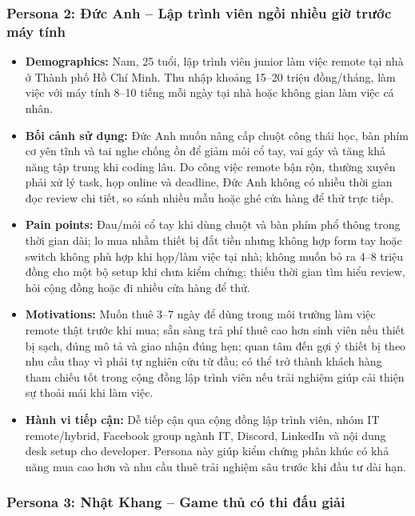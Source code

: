 \subsubsection{Persona 2: Đức Anh -- Lập trình viên ngồi nhiều giờ trước máy tính}

\begin{itemize}
    \item \textbf{Demographics:} Nam, 25 tuổi, lập trình viên junior làm việc remote tại nhà ở Thành phố Hồ Chí Minh. Thu nhập khoảng 15--20 triệu đồng/tháng, làm việc với máy tính 8--10 tiếng mỗi ngày tại nhà hoặc không gian làm việc cá nhân.
    \item \textbf{Bối cảnh sử dụng:} Đức Anh muốn nâng cấp chuột công thái học, bàn phím cơ yên tĩnh và tai nghe chống ồn để giảm mỏi cổ tay, vai gáy và tăng khả năng tập trung khi coding lâu. Do công việc remote bận rộn, thường xuyên phải xử lý task, họp online và deadline, Đức Anh không có nhiều thời gian đọc review chi tiết, so sánh nhiều mẫu hoặc ghé cửa hàng để thử trực tiếp.
    \item \textbf{Pain points:} Đau/mỏi cổ tay khi dùng chuột và bàn phím phổ thông trong thời gian dài; lo mua nhầm thiết bị đắt tiền nhưng không hợp form tay hoặc switch không phù hợp khi họp/làm việc tại nhà; không muốn bỏ ra 4--8 triệu đồng cho một bộ setup khi chưa kiểm chứng; thiếu thời gian tìm hiểu review, hỏi cộng đồng hoặc đi nhiều cửa hàng để thử.
    \item \textbf{Motivations:} Muốn thuê 3--7 ngày để dùng trong môi trường làm việc remote thật trước khi mua; sẵn sàng trả phí thuê cao hơn sinh viên nếu thiết bị sạch, đúng mô tả và giao nhận đúng hẹn; quan tâm đến gợi ý thiết bị theo nhu cầu thay vì phải tự nghiên cứu từ đầu; có thể trở thành khách hàng tham chiếu tốt trong cộng đồng lập trình viên nếu trải nghiệm giúp cải thiện sự thoải mái khi làm việc.
    \item \textbf{Hành vi tiếp cận:} Dễ tiếp cận qua cộng đồng lập trình viên, nhóm IT remote/hybrid, Facebook group ngành IT, Discord, LinkedIn và nội dung desk setup cho developer. Persona này giúp \projectname{} kiểm chứng phân khúc có khả năng mua cao hơn và nhu cầu thuê trải nghiệm sâu trước khi đầu tư dài hạn.
\end{itemize}

\subsubsection{Persona 3: Nhật Khang -- Game thủ có thi đấu giải}

